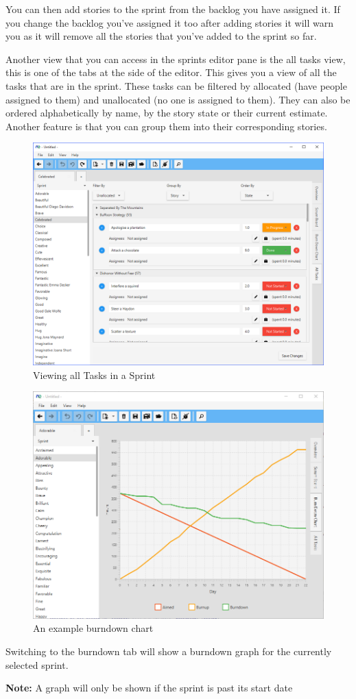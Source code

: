 You can then add stories to the sprint from the backlog you have assigned it. If you change the backlog you've assigned it too after adding stories it will warn you as it will remove all the stories that you've added to the sprint so far.

Another view that you can access in the sprints editor pane is the all tasks view, this is one of the tabs at the side of the editor. This gives you a view of all the tasks that are in the sprint. These tasks can be filtered by allocated (have people assigned to them) and unallocated (no one is assigned to them). They can also be ordered alphabetically by name, by the story state or their current estimate. Another feature is that you can group them into their corresponding stories.

\begin{figure}[H]
\centering
\includegraphics[width=\textwidth]{images/screenshots/sprint2.PNG}
\caption{Viewing all Tasks in a Sprint}
\label{fig:new_project}
\end{figure}

\begin{figure}[H]
\centering
\includegraphics[width=\textwidth]{images/screenshots/burndown.png}
\caption{An example burndown chart}
\label{fig:burndown}
\end{figure}

Switching to the burndown tab will show a burndown graph for the currently selected sprint.

\textbf{Note:}\newline
A graph will only be shown if the sprint is past its start date